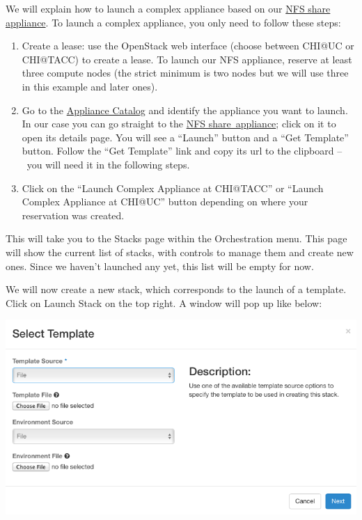 We will explain how to launch a complex appliance based on our
\href{https://www.chameleoncloud.org/appliances/25/}{NFS share
appliance}. To launch a complex appliance, you only need to follow these
steps:

\begin{enumerate}
\item
  Create a lease: use the OpenStack web interface (choose between CHI@UC
  or CHI@TACC) to create a lease. To launch our NFS appliance, reserve
  at least three compute nodes (the strict minimum is two nodes but we
  will use three in this example and later ones).
\item
  Go to the \href{https://www.chameleoncloud.org/appliances/}{Appliance
  Catalog} and identify the appliance you want to launch. In our case
  you can go straight to the
  \href{https://www.chameleoncloud.org/appliances/25/}{NFS
  share~appliance}; click on it to open its details page. You will see a
  ``Launch'' button and a ``Get Template'' button. Follow the ``Get
  Template'' link and copy its url to the clipboard --~you will need it
  in the following steps.
\item
  Click on the ``Launch Complex Appliance at CHI@TACC'' or ``Launch
  Complex Appliance at CHI@UC'' button depending on where your
  reservation was created.
\end{enumerate}

This will take you to the Stacks page within the Orchestration menu.
This page will show the current list of stacks, with controls to manage
them and create new ones. Since we haven't launched any yet, this list
will be empty for now.

We will now create a new stack, which corresponds to the launch of a
template. Click on Launch Stack on the top right. A window will pop up
like below:

\includegraphics[width=\columnwidth]{images/chameleon/Launch-Stack.png}

